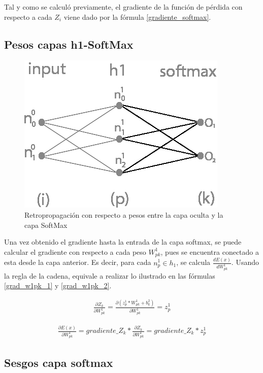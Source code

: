 Tal y como se calculó previamente, el gradiente de la función de pérdida con respecto a cada $Z_i$ viene dado por la fórmula \ref{gradiente_softmax}.


\subsection{Pesos capas h1-SoftMax}

\begin{figure}[H]
	\centering
	\includegraphics[scale=0.35]{imagenes/nn_1_capa_pesos_h1_output.jpg}  
	\caption{Retropropagación con respecto a pesos entre la capa oculta y la capa SoftMax}
	\label{fig:nn_1_pesos_h1_output}
\end{figure}

Una vez obtenido el gradiente hasta la entrada de la capa softmax, se puede calcular el gradiente con respecto a cada peso $W^1_{pk}$, pues se encuentra conectado a esta desde la capa anterior. Es decir, para cada $n^1_p\in h_1$, se calcula $\frac{dE(x)}{dW^1_{pk}}$. Usando la regla de la cadena, equivale a realizar lo ilustrado en las fórmulas \ref{grad_w1pk_1} y \ref{grad_w1pk_2}.

\begin{gather}
	\frac{\partial Z_k}{\partial W^1_{pk}} = \frac{\partial (z^1_p * W^1 _{pk}+ b^2_k)}{\partial W^1_{pk }} = z^1_p
	\label{grad_w1pk_1}
\end{gather}

\begin{gather}
	\frac{\partial E(x)}{\partial W^1_{pk }} =  gradiente\_Z_k * \frac{\partial Z_k}{\partial W^1_{pk }} = gradiente\_Z_k * z^1_p
	\label{grad_w1pk_2}
\end{gather}

\subsection{Sesgos capa softmax}

